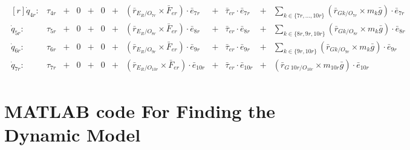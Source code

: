 \documentclass[a4paper,10pt]{article}
\begin{document}
\begin{align}
{\begin{matrix*}[r]
  \dot{q}_{4r}: & \tau_{4r} & + & 0 & + & 0 & + & \left(\bar{r}_{E_R/O_{7r}} \times \bar{F}_{er} \right) \cdot \bar{e}_{7r} & + & \bar\tau_{er} \cdot \bar{e}_{7r} & + & \sum\limits_{k \in \{ 7r, ... , 10r \}} \left( \bar{r}_{Gk/O_{7r}} \times m_k\bar{g} \right) \cdot \bar{e}_{7r} \\
  \dot{q}_{5r}: & \tau_{5r} & + & 0 & + & 0 & + & \left(\bar{r}_{E_R/O_{8r}} \times \bar{F}_{er} \right) \cdot \bar{e}_{8r} & + & \bar\tau_{er} \cdot \bar{e}_{8r} & + &  \sum\limits_{k \in \{ 8r, 9r, 10r \}} \left( \bar{r}_{Gk/O_{8r}} \times m_k\bar{g} \right) \cdot \bar{e}_{8r} \\
  \dot{q}_{6r}: & \tau_{6r} & + & 0 & + & 0 & + & \left(\bar{r}_{E_R/O_{9r}} \times \bar{F}_{er} \right) \cdot \bar{e}_{9r} & + & \bar\tau_{er} \cdot \bar{e}_{9r} & + & \sum\limits_{k \in \{ 9r, 10r \}} \left( \bar{r}_{Gk/O_{9r}} \times m_k\bar{g} \right) \cdot \bar{e}_{9r} \\
  \dot{q}_{7r}: & \tau_{7r} & + & 0 & + & 0 & + & \left(\bar{r}_{E_R/O_{10r}} \times \bar{F}_{er} \right) \cdot \bar{e}_{10r} & + & \bar\tau_{er} \cdot \bar{e}_{10r} & + & \left(\bar{r}_{G\;10r/O_{10r}} \times m_{10r}\bar{g} \right) \cdot \bar{e}_{10r} 
 \end{matrix*}}
\end{align}


\section{MATLAB code For Finding the Dynamic Model}
\end{document}
